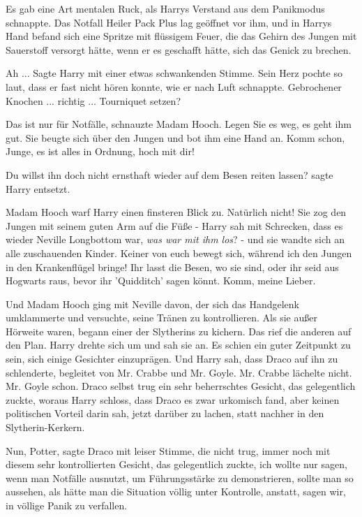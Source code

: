 Es gab eine Art mentalen Ruck, als Harrys Verstand aus dem Panikmodus schnappte.
Das Notfall Heiler Pack Plus lag geöffnet vor ihm, und in Harrys Hand befand
sich eine Spritze mit flüssigem Feuer, die das Gehirn des Jungen mit Sauerstoff
versorgt hätte, wenn er es geschafft hätte, sich das Genick zu brechen.

\glqq Ah ...\grqq{} Sagte Harry mit einer etwas schwankenden Stimme. Sein Herz
pochte so laut, dass er fast nicht hören konnte, wie er nach Luft schnappte.
\glqq Gebrochener Knochen ... richtig ... Tourniquet setzen?\grqq{}

\glqq Das ist nur für Notfälle\grqq{}, schnauzte Madam Hooch. \glqq Legen Sie es
weg, es geht ihm gut.\grqq{} Sie beugte sich über den Jungen und bot ihm eine
Hand an. \glqq Komm schon, Junge, es ist alles in Ordnung, hoch mit dir!\grqq{}

\glqq Du willst ihn doch nicht ernsthaft wieder auf dem Besen reiten
lassen?\grqq{} sagte Harry entsetzt.

Madam Hooch warf Harry einen finsteren Blick zu. \glqq Natürlich nicht!\grqq{}
Sie zog den Jungen mit seinem guten Arm auf die Füße - Harry sah mit Schrecken,
dass es wieder Neville Longbottom war, \emph{was war mit ihm los}? - und sie
wandte sich an alle zuschauenden Kinder. \glqq Keiner von euch bewegt sich,
während ich den Jungen in den Krankenflügel bringe! Ihr lasst die Besen, wo sie
sind, oder ihr seid aus Hogwarts raus, bevor ihr 'Quidditch' sagen könnt. Komm,
meine Lieber.\grqq{}

Und Madam Hooch ging mit Neville davon, der sich das Handgelenk umklammerte und
versuchte, seine Tränen zu kontrollieren. Als sie außer Hörweite waren, begann
einer der Slytherins zu kichern. Das rief die anderen auf den Plan. Harry drehte
sich um und sah sie an. Es schien ein guter Zeitpunkt zu sein, sich einige
Gesichter einzuprägen. Und Harry sah, dass Draco auf ihn zu schlenderte,
begleitet von Mr. Crabbe und Mr. Goyle. Mr. Crabbe lächelte nicht. Mr. Goyle
schon. Draco selbst trug ein sehr beherrschtes Gesicht, das gelegentlich zuckte,
woraus Harry schloss, dass Draco es zwar urkomisch fand, aber keinen politischen
Vorteil darin sah, jetzt darüber zu lachen, statt nachher in den
Slytherin-Kerkern.

\glqq Nun, Potter\grqq{}, sagte Draco mit leiser Stimme, die nicht trug, immer
noch mit diesem sehr kontrollierten Gesicht, das gelegentlich zuckte, \glqq ich
wollte nur sagen, wenn man Notfälle ausnutzt, um Führungsstärke zu
demonstrieren, sollte man so aussehen, als hätte man die Situation völlig unter
Kontrolle, anstatt, sagen wir, in völlige Panik zu verfallen.\grqq{}

